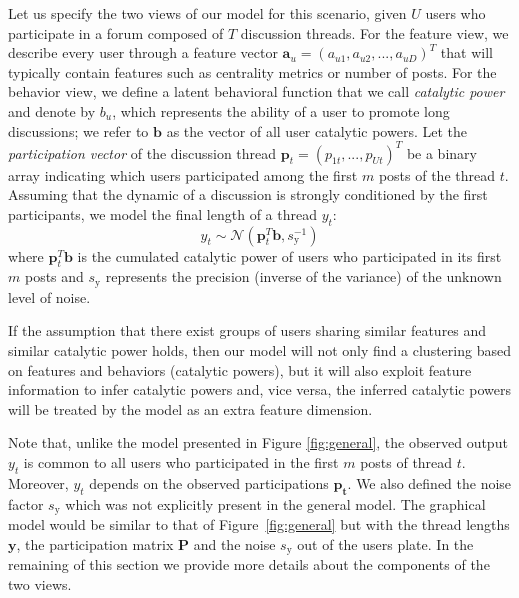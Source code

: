 \documentclass[smallextended]{svjour3}          %
\begin{document}
Let us specify the two views of our model for this scenario, given $U$ users who participate in a forum composed of $T$ discussion threads. For the feature view, we describe every user through a feature vector $\mathbf{a}_u=(a_{u1}, a_{u2},...,a_{uD})^T$ that will typically contain features such as centrality metrics or number of posts. For the behavior view, we define a latent behavioral function that we call \textit{catalytic power} and denote by $b_u$, which represents the ability of a user to promote long discussions; we refer to $\mathbf{b}$ as the vector of all user catalytic powers. Let the \textit{participation vector} of the discussion thread $\mathbf{p}_t = (p_{1t},...,p_{Ut})^T$ be a binary array indicating which users participated among the first $m$ posts of the thread $t$. Assuming  that the dynamic of a discussion is strongly conditioned by the first participants, we model the final length of a thread $y_t$:
\begin{equation*}
y_t \sim \mathcal{N}(\mathbf{p}_t^T\mathbf{b}, s_{\text{y}}^{-1})
\end{equation*} 
where $\mathbf{p}_t^T\mathbf{b}$ is the cumulated catalytic power of users who participated in its first $m$ posts and $s_{\text{y}}$ represents the precision (inverse of the variance) of the unknown level of noise.

If the assumption that there exist groups of users sharing similar features and similar catalytic power holds, then our model will not only find a clustering based on features and behaviors (catalytic powers), but it will also exploit feature information to infer catalytic powers and, vice versa, the inferred catalytic powers will be treated by the model as an extra feature dimension.

Note that, unlike the model presented in Figure \ref{fig:general}, the observed output $y_t$ is common to all users who participated in the first $m$ posts of thread $t$. Moreover, $y_t$ depends on the observed participations $\mathbf{p_t}$. We also defined the noise factor $s_{\text{y}}$ which was not explicitly present in the general model. The graphical model would be similar to that of Figure~\ref{fig:general} but with the thread lengths $\mathbf{y}$, the participation matrix $\mathbf{P}$ and the noise $s_{\text{y}}$ out of the users plate. In the remaining of this section we provide more details about the components of the two views.
\end{document}
